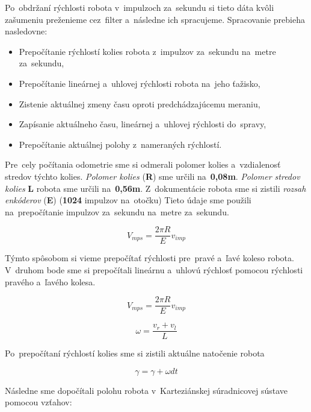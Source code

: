 Po~obdržaní rýchlosti robota v~impulzoch za~sekundu si tieto dáta kvôli zašumeniu preženieme cez~filter
a~následne ich spracujeme. Spracovanie prebieha nasledovne:

\begin{itemize}
	\item Prepočítanie rýchlostí kolies robota z~impulzov za~sekundu na~metre za~sekundu,
	\item Prepočítanie lineárnej a~uhlovej rýchlosti robota na~jeho ťažisko,
	\item Zistenie aktuálnej zmeny času oproti predchádzajúcemu meraniu,
	\item Zapísanie aktuálneho času, lineárnej a~uhlovej rýchlosti do~spravy,
	\item Prepočítanie aktuálnej polohy z~nameraných rýchlostí.
\end{itemize}

Pre~cely počítania odometrie sme si odmerali polomer kolies a~vzdialenosť stredov týchto kolies.
\textit{Polomer kolies} (\textbf{R}) sme určili na~\textbf{0,08m}. \textit{Polomer stredov kolies}
\textbf{L} robota sme určili na~\textbf{0,56m}. Z~dokumentácie robota \cite{encoder} sme si zistili
\textit{rozsah enkóderov} (\textbf{E}) (\textbf{1024} impulzov na~otočku)  Tieto údaje sme použili
na~prepočítanie impulzov za~sekundu na~metre za~sekundu.

\begin{equation}
	V_{mps} = \frac{2 \pi R}{E} v_{imp}
	\label{eq:vmps}
\end{equation}

Týmto spôsobom si vieme prepočítať rýchlosti pre~pravé a~ľavé koleso robota.
V~druhom bode sme si prepočítali lineárnu a~uhlovú rýchlosť pomocou rýchlosti pravého a~ľavého kolesa.

\begin{equation}
	V_{mps} = \frac{2 \pi R}{E} v_{imp}
	\label{eq:vlin}
\end{equation}


\begin{equation}
	\omega = \frac{v_{r} + v_{l}}{L}
	\label{eq:vang}
\end{equation}

Po~prepočítaní rýchlostí kolies sme si zistili aktuálne natočenie robota

\begin{equation}
	\gamma = \gamma + \omega dt
	\label{eq:angZ}
\end{equation}

Následne sme dopočítali polohu robota v~Karteziánskej súradnicovej sústave pomocou vzťahov:

